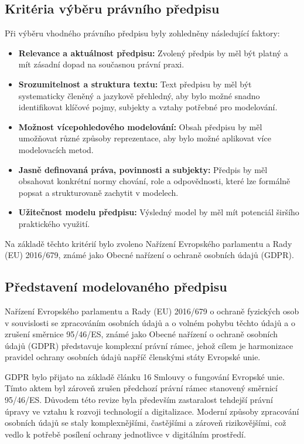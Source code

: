 \subsection{Kritéria výběru právního předpisu}
\label{sec:kriteria-vyberu-právního-predpisu}
Při výběru vhodného právního předpisu byly zohledněny následující faktory:
\begin{itemize}
  \item \textbf{Relevance a aktuálnost předpisu:} Zvolený předpis by měl být platný a mít zásadní dopad na současnou právní praxi.
  \item \textbf{Srozumitelnost a struktura textu:} Text předpisu by měl být systematicky členěný a jazykově přehledný, aby bylo možné snadno identifikovat klíčové pojmy, subjekty a vztahy potřebné pro modelování.
  \item \textbf{Možnost vícepohledového modelování:} Obsah předpisu by měl umožňovat různé způsoby reprezentace, aby bylo možné aplikovat více modelovacích metod.
  \item \textbf{Jasně definovaná práva, povinnosti a subjekty:} Předpis by měl obsahovat konkrétní normy chování, role a odpovědnosti, které lze formálně popsat a strukturovaně zachytit v modelech.
  \item \textbf{Užitečnost modelu předpisu:} Výsledný model by měl mít potenciál širšího praktického využití.
\end{itemize}

Na základě těchto kritérií bylo zvoleno Nařízení Evropského parlamentu a Rady (EU) 2016/679, známé jako Obecné nařízení o ochraně osobních údajů (GDPR).


\subsection{Představení modelovaného předpisu}
\label{sec:predstaveni-modelovaneho-predpisu}
Nařízení Evropského parlamentu a Rady (EU) 2016/679 o ochraně fyzických osob v souvislosti se zpracováním osobních údajů a o volném pohybu těchto údajů a o zrušení směrnice 95/46/ES, známé jako Obecné nařízení o ochraně osobních údajů (GDPR) představuje komplexní právní rámec, jehož cílem je harmonizace pravidel ochrany osobních údajů napříč členskými státy Evropské unie. \cite{GDPR,mvčr_gdpr}

GDPR bylo přijato na základě článku 16 Smlouvy o fungování Evropské unie. Tímto aktem byl zároveň zrušen předchozí právní rámec stanovený směrnicí 95/46/ES. Důvodem této revize byla především zastaralost tehdejší právní úpravy ve vztahu k rozvoji technologií a digitalizace. Moderní způsoby zpracování osobních údajů se staly komplexnějšími, častějšími a zároveň rizikovějšími, což vedlo k potřebě posílení ochrany jednotlivce v digitálním prostředí. \cite{GDPR}

